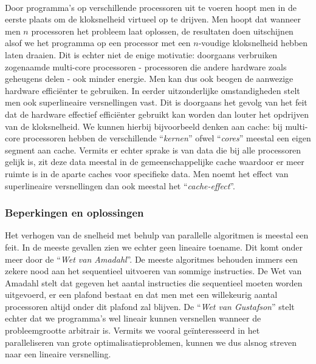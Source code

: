 \paragraph{}
Door programma's op verschillende processoren uit te voeren hoopt men in de eerste plaats om de kloksnelheid virtueel op te drijven. Men hoopt dat wanneer men $n$ processoren het probleem laat oplossen, de resultaten doen uitschijnen alsof we het programma op een processor met een $n$-voudige kloksnelheid hebben laten draaien. Dit is echter niet de enige motivatie: doorgaans verbruiken zogenaamde multi-core processoren - processoren die andere hardware zoals geheugens delen - ook minder energie. Men kan dus ook beogen de aanwezige hardware effici\"enter te gebruiken. In eerder uitzonderlijke omstandigheden stelt men ook superlineaire versnellingen vast. Dit is doorgaans het gevolg van het feit dat de hardware effectief effici\"enter gebruikt kan worden dan louter het opdrijven van de kloksnelheid. We kunnen hierbij bijvoorbeeld denken aan cache: bij multi-core processoren hebben de verschillende ``\emph{kernen}'' ofwel ``\emph{cores}'' meestal een eigen segment aan cache. Vermits er echter sprake is van data die bij alle processoren gelijk is, zit deze data meestal in de gemeenschappelijke cache waardoor er meer ruimte is in de aparte caches voor specifieke data. Men noemt het effect van superlineaire versnellingen dan ook meestal het ``\emph{cache-effect}''\cite{cacheEffect}.

\subsubsection{Beperkingen en oplossingen}

Het verhogen van de snelheid met behulp van parallelle algoritmen is meestal een feit. In de meeste gevallen zien we echter geen lineaire toename. Dit komt onder meer door de ``\emph{Wet van Amadahl}''\cite{amadalhsLaw}. De meeste algoritmes behouden immers een zekere nood aan het sequentieel uitvoeren van sommige instructies. De Wet van Amadahl stelt dat gegeven het aantal instructies die sequentieel moeten worden uitgevoerd, er een plafond bestaat en dat men met een willekeurig aantal processoren altijd onder dit plafond zal blijven. De ``\emph{Wet van Gustafson}''\cite{gustafsonsLaw} stelt echter dat we programma's wel lineair kunnen versnellen wanneer de probleemgrootte arbitrair is. Vermits we vooral ge\"interesseerd in het paralleliseren van grote optimalisatieproblemen, kunnen we dus alsnog streven naar een lineaire versnelling.

